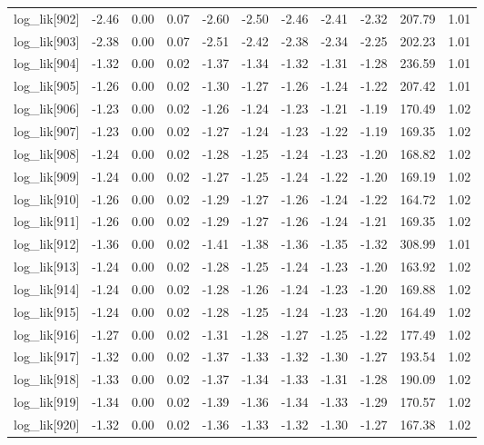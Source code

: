 \begin{table}[ht]
\begin{tabular}{rrrrrrrrrrr}
  log\_lik[902] & -2.46 & 0.00 & 0.07 & -2.60 & -2.50 & -2.46 & -2.41 & -2.32 & 207.79 & 1.01 \\ 
  log\_lik[903] & -2.38 & 0.00 & 0.07 & -2.51 & -2.42 & -2.38 & -2.34 & -2.25 & 202.23 & 1.01 \\ 
  log\_lik[904] & -1.32 & 0.00 & 0.02 & -1.37 & -1.34 & -1.32 & -1.31 & -1.28 & 236.59 & 1.01 \\ 
  log\_lik[905] & -1.26 & 0.00 & 0.02 & -1.30 & -1.27 & -1.26 & -1.24 & -1.22 & 207.42 & 1.01 \\ 
  log\_lik[906] & -1.23 & 0.00 & 0.02 & -1.26 & -1.24 & -1.23 & -1.21 & -1.19 & 170.49 & 1.02 \\ 
  log\_lik[907] & -1.23 & 0.00 & 0.02 & -1.27 & -1.24 & -1.23 & -1.22 & -1.19 & 169.35 & 1.02 \\ 
  log\_lik[908] & -1.24 & 0.00 & 0.02 & -1.28 & -1.25 & -1.24 & -1.23 & -1.20 & 168.82 & 1.02 \\ 
  log\_lik[909] & -1.24 & 0.00 & 0.02 & -1.27 & -1.25 & -1.24 & -1.22 & -1.20 & 169.19 & 1.02 \\ 
  log\_lik[910] & -1.26 & 0.00 & 0.02 & -1.29 & -1.27 & -1.26 & -1.24 & -1.22 & 164.72 & 1.02 \\ 
  log\_lik[911] & -1.26 & 0.00 & 0.02 & -1.29 & -1.27 & -1.26 & -1.24 & -1.21 & 169.35 & 1.02 \\ 
  log\_lik[912] & -1.36 & 0.00 & 0.02 & -1.41 & -1.38 & -1.36 & -1.35 & -1.32 & 308.99 & 1.01 \\ 
  log\_lik[913] & -1.24 & 0.00 & 0.02 & -1.28 & -1.25 & -1.24 & -1.23 & -1.20 & 163.92 & 1.02 \\ 
  log\_lik[914] & -1.24 & 0.00 & 0.02 & -1.28 & -1.26 & -1.24 & -1.23 & -1.20 & 169.88 & 1.02 \\ 
  log\_lik[915] & -1.24 & 0.00 & 0.02 & -1.28 & -1.25 & -1.24 & -1.23 & -1.20 & 164.49 & 1.02 \\ 
  log\_lik[916] & -1.27 & 0.00 & 0.02 & -1.31 & -1.28 & -1.27 & -1.25 & -1.22 & 177.49 & 1.02 \\ 
  log\_lik[917] & -1.32 & 0.00 & 0.02 & -1.37 & -1.33 & -1.32 & -1.30 & -1.27 & 193.54 & 1.02 \\ 
  log\_lik[918] & -1.33 & 0.00 & 0.02 & -1.37 & -1.34 & -1.33 & -1.31 & -1.28 & 190.09 & 1.02 \\ 
  log\_lik[919] & -1.34 & 0.00 & 0.02 & -1.39 & -1.36 & -1.34 & -1.33 & -1.29 & 170.57 & 1.02 \\ 
  log\_lik[920] & -1.32 & 0.00 & 0.02 & -1.36 & -1.33 & -1.32 & -1.30 & -1.27 & 167.38 & 1.02 \\ 

\end{tabular}
\end{table}

